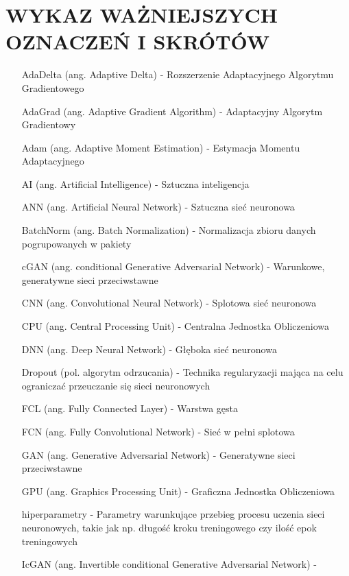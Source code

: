 \section*{WYKAZ WAŻNIEJSZYCH OZNACZEŃ I SKRÓTÓW}

  \bigskip

  \begin{itemize}
    \item[AdaDelta] (ang. Adaptive Delta) - Rozszerzenie Adaptacyjnego Algorytmu Gradientowego
    \item[AdaGrad] (ang. Adaptive Gradient Algorithm) - Adaptacyjny Algorytm Gradientowy
    \item[Adam] (ang. Adaptive Moment Estimation) - Estymacja Momentu Adaptacyjnego
    \item[AI] (ang. Artificial Intelligence) - Sztuczna inteligencja
    \item[ANN] (ang. Artificial Neural Network) - Sztuczna sieć neuronowa
    \item[BatchNorm] (ang. Batch Normalization) - Normalizacja zbioru danych
    pogrupowanych w pakiety
    \item[cGAN] (ang. conditional Generative Adversarial Network) - Warunkowe,
    generatywne sieci przeciwstawne
    \item[CNN] (ang. Convolutional Neural Network) - Splotowa sieć neuronowa
    \item[CPU] (ang. Central Processing Unit) - Centralna Jednostka Obliczeniowa
    \item[DNN] (ang. Deep Neural Network) - Głęboka sieć neuronowa
    \item[Dropout] (pol. algorytm odrzucania) - Technika
    regularyzacji mająca na celu ograniczać przeuczanie się sieci neuronowych
    \item[FCL] (ang. Fully Connected Layer) - Warstwa gęsta
    \item[FCN] (ang. Fully Convolutional Network) - Sieć w pełni splotowa
    \item[GAN] (ang. Generative Adversarial Network) - Generatywne sieci
    przeciwstawne
    \item[GPU] (ang. Graphics Processing Unit) - Graficzna Jednostka Obliczeniowa
    \item[hiperparametry] - Parametry warunkujące przebieg procesu uczenia sieci neuronowych,
    takie jak np. długość kroku treningowego czy ilość epok treningowych
    \item[IcGAN] (ang. Invertible conditional Generative Adversarial Network) -

\end{itemize}
